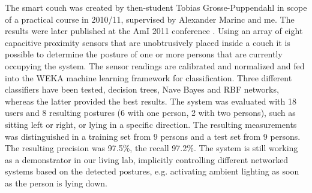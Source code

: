 The smart couch was created by then-student Tobias Grosse-Puppendahl in scope of a practical course in 2010/11, supervised by Alexander Marinc and me. The results were later published at the AmI 2011 conference \cite{Couch2011}. Using an array of eight capacitive proximity sensors that are unobtrusively placed inside a couch it is possible to determine the posture of one or more persons that are currently occupying the system. The sensor readings are calibrated and normalized and fed into the WEKA machine learning framework for classification. Three different classifiers have been tested, decision trees, Nave Bayes and RBF networks, whereas the latter provided the best results. The system was evaluated with 18 users and 8 resulting postures (6 with one person, 2 with two persons), such as sitting left or right, or lying in a specific direction. The resulting measurements was distinguished in a training set from 9 persons and a test set from 9 persons. The resulting precision was 97.5\%, the recall 97.2\%. The system is still working as a demonstrator in our living lab, implicitly controlling different networked systems based on the detected postures, e.g. activating ambient lighting as soon as the person is lying down.


